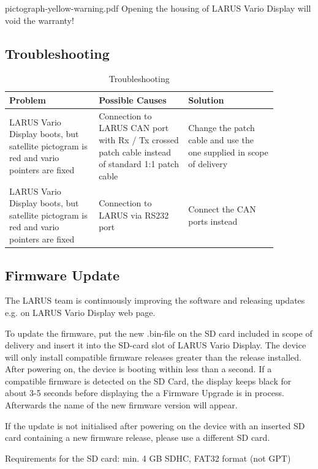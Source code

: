 \picnote
	{pictograph-yellow-warning.pdf}
	{Opening the housing of LARUS Vario Display will void the warranty!}

\subsection{Troubleshooting}
\begin{table}[ht!]
	\begin{tabular}{L{0.29\linewidth} L{0.29\linewidth} L{0.29\linewidth}}
		\toprule
		\textbf{Problem} & \textbf{Possible Causes} & \textbf{Solution} \\
		\midrule
		LARUS Vario Display boots, but satellite pictogram is red and vario pointers are fixed
		& Connection to LARUS CAN port with Rx / Tx crossed patch cable instead of standard 1:1 patch cable
		& Change the patch cable and use the one supplied in scope of delivery \\
		LARUS Vario Display boots, but satellite pictogram is red and vario pointers are fixed
		& Connection to LARUS via RS232 port
		& Connect the CAN ports instead \\
		\bottomrule
	\end{tabular}
	\caption{Troubleshooting}
\end{table}

\subsection{Firmware Update}

The LARUS team is continuously improving the software and releasing updates e.g. on LARUS Vario
Display web page.

To update the firmware, put the new .bin-file on the SD card included in scope of delivery and insert
it into the SD-card slot of LARUS Vario Display. The device will only install compatible firmware
releases greater than the release installed. After powering on, the device is booting within less than a
second. If a compatible firmware is detected on the SD Card, the display keeps black for about 3-5
seconds before displaying the a Firmware Upgrade is in process. Afterwards the name of the new
firmware version will appear.

If the update is not initialised after powering on the device with an inserted SD card containing a new
firmware release, please use a different SD card.

Requirements for the SD card: min. 4 GB SDHC, FAT32 format (not GPT)


